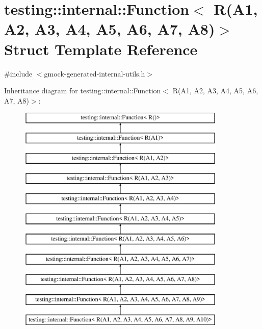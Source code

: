 \hypertarget{structtesting_1_1internal_1_1_function_3_01_r_07_a1_00_01_a2_00_01_a3_00_01_a4_00_01_a5_00_01_a6_00_01_a7_00_01_a8_08_4}{}\section{testing\+::internal\+::Function$<$ R(A1, A2, A3, A4, A5, A6, A7, A8)$>$ Struct Template Reference}
\label{structtesting_1_1internal_1_1_function_3_01_r_07_a1_00_01_a2_00_01_a3_00_01_a4_00_01_a5_00_01_a6_00_01_a7_00_01_a8_08_4}


{\ttfamily \#include $<$gmock-\/generated-\/internal-\/utils.\+h$>$}

Inheritance diagram for testing\+::internal\+::Function$<$ R(A1, A2, A3, A4, A5, A6, A7, A8)$>$\+:\begin{figure}[H]
\begin{center}
\leavevmode
\includegraphics[height=11.000000cm]{da/db1/structtesting_1_1internal_1_1_function_3_01_r_07_a1_00_01_a2_00_01_a3_00_01_a4_00_01_a5_00_01_a6_00_01_a7_00_01_a8_08_4}
\end{center}
\end{figure}
